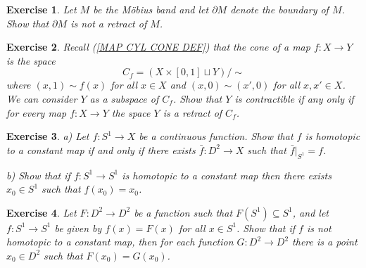\documentclass[11pt, letterpaper, oneside]{report}
\theoremstyle{pplain}
\theoremstyle{ddefinition}
\theoremstyle{nnn}
\theoremstyle{eexercise}
\newtheorem{exercise}{Exercise}[chapter]
\begin{document}
\begin{exercise}
Let  $M$ be the M\"obius band and let $\partial M$ denote the boundary of $M$. 
Show that $\partial M$ is not a retract of $M$. 
\end{exercise}




\begin{exercise}
Recall (\ref{MAP CYL CONE DEF}) that the cone of a map $f\colon X \to Y$  is the space  
$$C_{f} =  (X\times [0, 1] \sqcup Y)/{\sim}$$
where $(x, 1) \sim f(x)$ for all $x\in X$ and $(x,0)\sim (x', 0)$ for all $x, x'\in X$. We 
can consider $Y$ as a subspace of $C_{f}$. Show that  $Y$ is contractible if any only 
if for every map $f\colon X \to Y$ the space $Y$ is a retract of $C_{f}$. 
\end{exercise}




\begin{exercise}
\label{S1 TO D2 EXT EXERCISE}
a) Let $f\colon S^{1} \to X$ be a continuous function. Show that $f$ is homotopic to a constant map 
if and only if there exists $\bar{f}\colon D^{2} \to X$ such that $\bar{f}|_{S^{1}} = f$. 

b) Show that if $f\colon S^{1} \to S^{1}$ is homotopic to a constant map then there exists $x_{0}\in S^{1}$
such that $f(x_{0}) = x_{0}$. 
\end{exercise}







\begin{exercise}
Let $F\colon D^{2} \to D^{2}$ be a function such that $F(S^{1}) \subseteq S^{1}$, and let  $f\colon S^{1}\to S^{1}$ 
be given by $f(x) = F(x)$  for all $x\in S^{1}$. Show that if $f$ is not homotopic to a constant map, then for each function $G\colon D^{2} \to D^{2}$ there is a point $x_{0}\in D^{2}$ such that $F(x_{0}) = G(x_{0})$.
\end{exercise}
\end{document}
